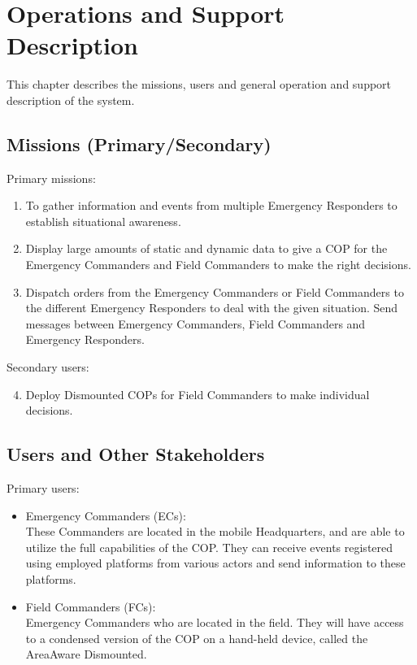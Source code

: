 \chapter{Operations and Support Description}
\label{chp_operations}
This chapter describes the missions, users and general operation and support description of the system.

\section{Missions (Primary/Secondary)}
Primary missions:
\begin{enumerate}
	\item To gather information and events from multiple Emergency Responders to establish situational awareness.
	\item Display large amounts of static and dynamic data to give a COP for the Emergency Commanders and Field Commanders to make the right decisions.
	\item Dispatch orders from the Emergency Commanders or Field Commanders to the different Emergency Responders to deal with the given situation. Send messages between Emergency Commanders, Field Commanders and Emergency Responders.
\end{enumerate}

\noindent Secondary users:
\begin{enumerate}
	\setcounter{enumi}{3}
	\item Deploy Dismounted COPs for Field Commanders to make individual decisions.
\end{enumerate}

\section{Users and Other Stakeholders}
\noindent Primary users:
\begin{itemize}
	\item Emergency Commanders (ECs): \\
	These Commanders are located in the mobile Headquarters, and are able to utilize the full capabilities of the COP. They can receive events registered using employed platforms from various actors and send information to these platforms.
	\item Field Commanders (FCs):\\
	Emergency Commanders who are located in the field. They will have access to a condensed version of the COP on a hand-held device, called the AreaAware Dismounted.
\end{itemize}
	
